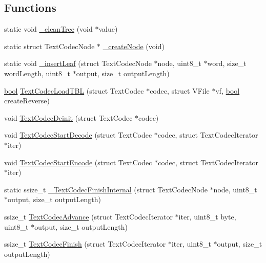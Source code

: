 \subsection*{Functions}
\begin{DoxyCompactItemize}
\item 
static void \mbox{\hyperlink{text-codec_8c_a0ed19a171f0f782872686bc021d9f74e}{\+\_\+clean\+Tree}} (void $\ast$value)
\item 
static struct Text\+Codec\+Node $\ast$ \mbox{\hyperlink{text-codec_8c_a2a8c8d4c442ca97dc71895c2304b04ef}{\+\_\+create\+Node}} (void)
\item 
static void \mbox{\hyperlink{text-codec_8c_ad10dba7b4d43d411ba0c4edbfe5d203c}{\+\_\+insert\+Leaf}} (struct Text\+Codec\+Node $\ast$node, uint8\+\_\+t $\ast$word, size\+\_\+t word\+Length, uint8\+\_\+t $\ast$output, size\+\_\+t output\+Length)
\item 
\mbox{\hyperlink{libretro_8h_a4a26dcae73fb7e1528214a068aca317e}{bool}} \mbox{\hyperlink{text-codec_8c_a64c21801885c3ff4c5d2d8c5377c1cd5}{Text\+Codec\+Load\+T\+BL}} (struct Text\+Codec $\ast$codec, struct V\+File $\ast$vf, \mbox{\hyperlink{libretro_8h_a4a26dcae73fb7e1528214a068aca317e}{bool}} create\+Reverse)
\item 
void \mbox{\hyperlink{text-codec_8c_afbd19db66f87e92647579c2b63c941cc}{Text\+Codec\+Deinit}} (struct Text\+Codec $\ast$codec)
\item 
void \mbox{\hyperlink{text-codec_8c_a8a637ebd50ab6b36d4eb5a4c2a9bf55b}{Text\+Codec\+Start\+Decode}} (struct Text\+Codec $\ast$codec, struct Text\+Codec\+Iterator $\ast$iter)
\item 
void \mbox{\hyperlink{text-codec_8c_a18c3e0575eb28af2d9eda669df015a74}{Text\+Codec\+Start\+Encode}} (struct Text\+Codec $\ast$codec, struct Text\+Codec\+Iterator $\ast$iter)
\item 
static ssize\+\_\+t \mbox{\hyperlink{text-codec_8c_ac88972a459e050dd63076e077babffd0}{\+\_\+\+Text\+Codec\+Finish\+Internal}} (struct Text\+Codec\+Node $\ast$node, uint8\+\_\+t $\ast$output, size\+\_\+t output\+Length)
\item 
ssize\+\_\+t \mbox{\hyperlink{text-codec_8c_a7090f20c2a664b7bf30416d0275e6b25}{Text\+Codec\+Advance}} (struct Text\+Codec\+Iterator $\ast$iter, uint8\+\_\+t byte, uint8\+\_\+t $\ast$output, size\+\_\+t output\+Length)
\item 
ssize\+\_\+t \mbox{\hyperlink{text-codec_8c_a9aeee69d7c95b369f219d0f5eb65a075}{Text\+Codec\+Finish}} (struct Text\+Codec\+Iterator $\ast$iter, uint8\+\_\+t $\ast$output, size\+\_\+t output\+Length)
\end{DoxyCompactItemize}


